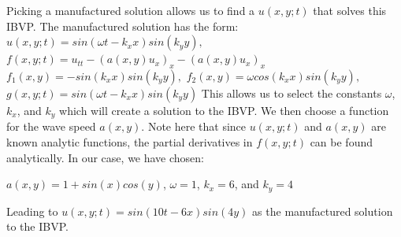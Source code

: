 \documentclass[12pt]{article}
\begin{document}
	Picking a manufactured solution allows us to find a $u(x,y;t)$ that solves this IBVP. The manufactured solution has the form: 
	\newline
		\hspace*{1in}$u(x,y;t)=sin(\omega t-k_xx)sin(k_yy),$
		\newline
		\hspace*{1in}$f(x,y;t)=u_{tt}-(a(x,y)u_x)_x-(a(x,y)u_x)_x$
		\newline
		\hspace*{1in}$f_1(x,y)=-sin(k_xx)sin(k_yy),$
		\newline
		\hspace*{1in}$f_2(x,y)=\omega cos(k_xx)sin(k_yy),$
		\newline
		\hspace*{1in}$g(x,y;t)=sin(\omega t-k_xx)sin(k_yy)$
	\newline \newline
	This allows us to select the constants $\omega$, $k_x$, and $k_y$ which will create a solution to the IBVP. We then choose a function for the wave speed $a(x,y)$. Note here that since $u(x,y;t)$ and $a(x,y)$ are known analytic functions, the partial derivatives in $f(x,y;t)$ can be found analytically. In our case, we have chosen:
	\begin{center}
	$a(x,y)=1+sin(x)cos(y)$, $\omega =1$, $k_x=6$, and $k_y=4$
    \end{center}
	Leading to $u(x,y;t)=sin(10t-6x)sin(4y)$ as the manufactured solution to the IBVP. 
	
\end{document}
